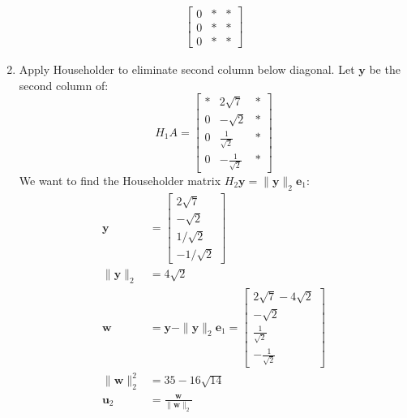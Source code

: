 \begin{enumerate}
\begin{align*}
\begin{bmatrix}
                                         0        & * & * \\
                                         0        & * & * \\
                                         0        & * & *
                                     \end{bmatrix}
          \end{align*}
    \item Apply Householder to eliminate second column below diagonal. Let $\mathbf{y}$ be the second column of:
          \[
              H_1 A = \begin{bmatrix} * & 2\sqrt{7} & * \\ 0 & -\sqrt{2} & * \\ 0 & \frac{1}{\sqrt{2}} & * \\ 0 & -\frac{1}{\sqrt{2}} & * \end{bmatrix}
          \]
          We want to find the Householder matrix $H_2\mathbf{y} = \|\mathbf{y}\|_2 \mathbf{e}_1$:
          \begin{align*}
              \mathbf{y}         & = \begin{bmatrix} 2\sqrt{7} \\ -\sqrt{2} \\ 1/\sqrt{2} \\ -1/\sqrt{2} \end{bmatrix}                                                                                                        \\
              \|\mathbf{y}\|_2   & = 4\sqrt{2}                                                                                                                                                                                \\
              \mathbf{w}         & = \mathbf{y} - \|\mathbf{y}\|_2 \mathbf{e}_1 = \begin{bmatrix} 2\sqrt{7} - 4\sqrt{2} \\ -\sqrt{2} \\ \frac{1}{\sqrt{2}} \\ -\frac{1}{\sqrt{2}} \end{bmatrix} \\
              \|\mathbf{w}\|_2^2 & = 35 - 16\sqrt{14}                                                                                                                                                                         \\
              \mathbf{u}_2       & = \frac{\mathbf{w}}{\|\mathbf{w}\|_2}                                                                                                                                                      \\

\end{align*}
\end{enumerate}
